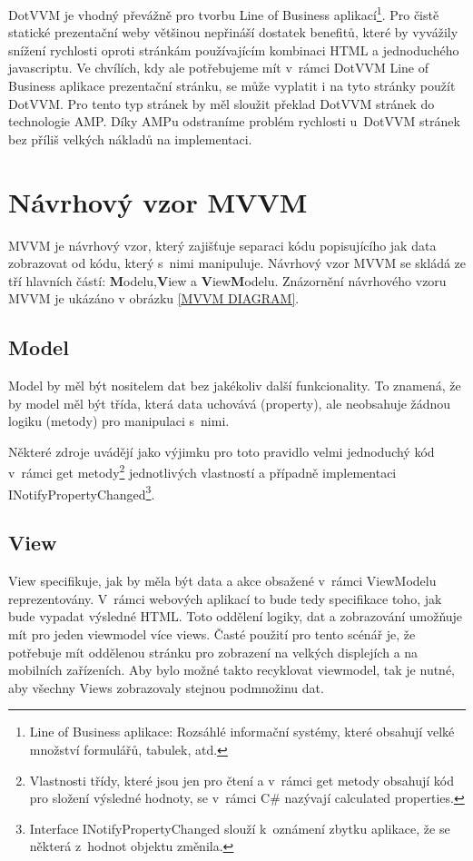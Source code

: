 DotVVM je vhodný převážně pro tvorbu Line of Business aplikací\footnote{Line of Business aplikace: Rozsáhlé informační systémy, které obsahují velké množství formulářů, tabulek, atd.}\cite{DotVVMIntro}. Pro čistě statické prezentační weby většinou nepřináší dostatek benefitů, které by vyvážily snížení rychlosti oproti stránkám používajícím kombinaci HTML a jednoduchého javascriptu. Ve chvílích, kdy ale potřebujeme mít v~rámci DotVVM Line of Business aplikace prezentační stránku, se může vyplatit i na tyto stránky použít DotVVM. Pro tento typ stránek by měl sloužit překlad DotVVM stránek do technologie AMP. Díky AMPu odstraníme problém rychlosti u~DotVVM stránek bez příliš velkých nákladů na implementaci.

\section{Návrhový vzor MVVM}
MVVM je návrhový vzor, který zajišťuje separaci kódu popisujícího jak data zobrazovat od kódu, který s~nimi manipuluje. Návrhový vzor MVVM se skládá ze tří hlavních částí: \textbf{M}odelu,\textbf{V}iew a \textbf{V}iew\textbf{M}odelu. Znázornění návrhového vzoru MVVM je ukázáno v obrázku \ref{MVVM DIAGRAM}.

\subsection*{Model}
Model by měl být nositelem dat bez jakékoliv další funkcionality. To znamená, že by model měl být třída, která data uchovává (property), ale neobsahuje žádnou logiku (metody) pro manipulaci s~nimi.

Některé zdroje uvádějí jako výjimku pro toto pravidlo velmi jednoduchý kód v~rámci get metody\footnote{Vlastnosti třídy, které jsou jen pro čtení a v~rámci get metody obsahují kód pro složení výsledné hodnoty, se v~rámci C# nazývají calculated properties.} jednotlivých vlastností a případně implementaci INotifyPropertyChanged\footnote{Interface INotifyPropertyChanged slouží k~oznámení zbytku aplikace, že se některá z~hodnot objektu změnila.}\cite{microsoft_2014}.

\subsection*{View}
View specifikuje, jak by měla být data a akce obsažené v~rámci ViewModelu reprezentovány. V~rámci webových aplikací to bude tedy specifikace toho, jak bude vypadat výsledné HTML. Toto oddělení logiky, dat a zobrazování umožňuje mít pro jeden viewmodel více views. Časté použití pro tento scénář je, že potřebuje mít oddělenou stránku pro zobrazení na velkých displejích a na mobilních zařízeních. Aby bylo možné takto recyklovat viewmodel, tak je nutné, aby všechny Views zobrazovaly stejnou podmnožinu dat.

